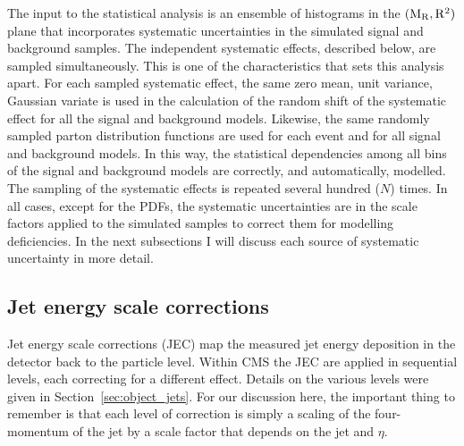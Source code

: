 
 
The input to the statistical analysis is an ensemble of histograms in the $(\mathrm{M_R},\mathrm{R^2})$ plane that 
incorporates systematic uncertainties in the simulated signal and background samples.  
The independent systematic effects, described below, are sampled simultaneously. 
This is one of the characteristics that sets this analysis apart. 
For each sampled systematic effect, the same zero mean, unit variance, Gaussian variate is used in
the calculation of the random shift of the systematic effect for all the signal and background
models. Likewise, the same randomly sampled parton distribution functions are used for each event
and for all signal and background models. 
In this way, the statistical dependencies among all bins of the signal and background models are
correctly, and automatically, modelled. The sampling of the systematic effects
is repeated several hundred ($N$) times.  
In all cases, except for the PDFs, the systematic uncertainties are in the scale factors 
applied to the simulated samples to correct them for modelling deficiencies. 
In the next subsections I will discuss each source of systematic uncertainty in more detail. 


\subsection{Jet energy scale corrections \label{sec:boost_JEC}}  

Jet energy scale corrections (JEC) map the measured jet energy deposition in the detector back to
the particle level. Within CMS the JEC are applied in sequential levels, each correcting for a
different effect. Details on the various levels were given in Section~\ref{sec:object_jets}.
For our discussion here, the important thing to remember is that each level of correction is simply
a scaling of the four-momentum of the jet by a scale factor that depends on the jet \pt and $\eta$.

